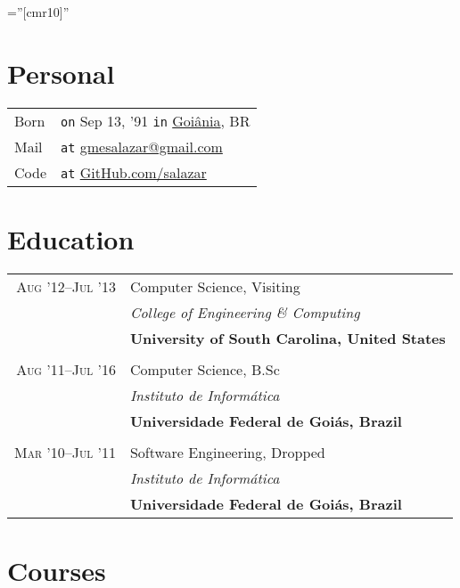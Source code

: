 \documentclass[a4paper,10pt]{article}
\begin{document}
\font\fb=''[cmr10]''

\par{\bigskip\par\vspace{4ex}}

\section{Personal}

\begin{tabular}{l@{\hskip 0.2cm}l}
  Born & \texttt{on} Sep 13, '91 \texttt{in}
                     \href{https://en.wikipedia.org/wiki/Goiania}{Goiânia}, BR \\
  Mail & \texttt{at} \href{mailto:gmesalazar@gmail.com}
                          {gmesalazar@gmail.com} \\
  Code & \texttt{at} \href{https://www.github.com/salazar/}
                          {GitHub.com/salazar}
\end{tabular}

\section{Education}

\begin{tabular}{r|p{11cm}}
  \textsc{Aug '12--Jul '13} & Computer Science, Visiting\\ &
  \emph{College of Engineering \& Computing}\\ &
  \textbf{University of South Carolina, United States}
  \\\multicolumn{2}{c}{} \\

  \textsc{Aug '11--Jul '16} & Computer Science, B.Sc\\ &
  \emph{Instituto de Informática}\\ &
  \textbf{Universidade Federal de Goiás, Brazil}
  \\\multicolumn{2}{c}{} \\

  \textsc{Mar '10--Jul '11} & Software Engineering, Dropped \\ &
  \emph{Instituto de Informática}\\ &
  \textbf{Universidade Federal de Goiás, Brazil}
\end{tabular}

\section{Courses}
\end{document}
